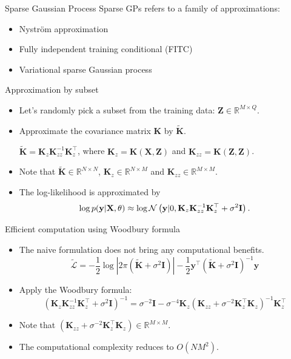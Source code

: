 \documentclass[14pt,aspectratio=1610]{beamer}
\newcommand{\yV}{\mathbf{y}}
\newcommand{\xM}{\mathbf{X}}
\newcommand{\K}{\mathbf{K}}
\newcommand{\R}{\mathbb{R}}
\newcommand{\zM}{\mathbf{Z}}
\newcommand{\bound}{\mathcal{L}}
\newcommand{\I}{\mathbf{I}}
\begin{document}
\begin{frame}{Sparse Gaussian Process}
Sparse GPs refers to a family of approximations:
\begin{itemize}
\item Nystr\"{o}m approximation \citep{WilliamsSeeger2001}
\item Fully independent training conditional (FITC) \citep{SnelsonZoubin2006}
\item Variational sparse Gaussian process \citep{Titsias2009}
\end{itemize}
\end{frame}

\begin{frame}{Approximation by subset}
\begin{itemize}
\item Let's randomly pick a subset from the training data: $\zM \in \R^{M\times Q}$.
\item Approximate the covariance matrix $\K$ by $\tilde{\K}$.
\vspace{5mm}

$\tilde{\K} = \K_z \K_{zz}^{-1} \K_z^\top$, where $\K_{z} = \K(\xM, \zM)$ and $\K_{zz} = \K(\zM, \zM)$.
\vspace{5mm}
\item Note that $\tilde{\K} \in \R^{N\times N}$, $\K_{z} \in \R^{N\times M}$ and $\K_{zz} \in \R^{M \times M}$.
\item The log-likelihood is approximated by 
\[
\log p(\yV|\xM, \theta) \approx  \log \gaussianDist{\yV}{0}{\K_z \K_{zz}^{-1} \K_z^\top+\sigma^2\I}.
\]
\end{itemize}
\end{frame}

\begin{frame}{Efficient computation using Woodbury formula}
\begin{itemize}
\item The naive formulation does not bring any computational benefits.
\[
\tilde{\bound} = -\frac{1}{2}\log |2\pi (\tilde{\K}+\sigma^2\I)| - \frac{1}{2} \yV^\top (\tilde{\K}+\sigma^2\I)^{-1} \yV
\]
\item Apply the Woodbury formula:
\[
(\K_z \K_{zz}^{-1} \K_z^\top+\sigma^2\I)^{-1} = \sigma^{-2}\I - \sigma^{-4} \K_z (\K_{zz} + \sigma^{-2}\K_z^\top\K_z)^{-1}\K_z^\top
\]
\item Note that $(\K_{zz} + \sigma^{-2}\K_z^\top\K_z) \in \R^{M \times M}$.
\item The computational complexity reduces to $O(NM^2)$.
\end{itemize}
\end{frame}
\end{document}
